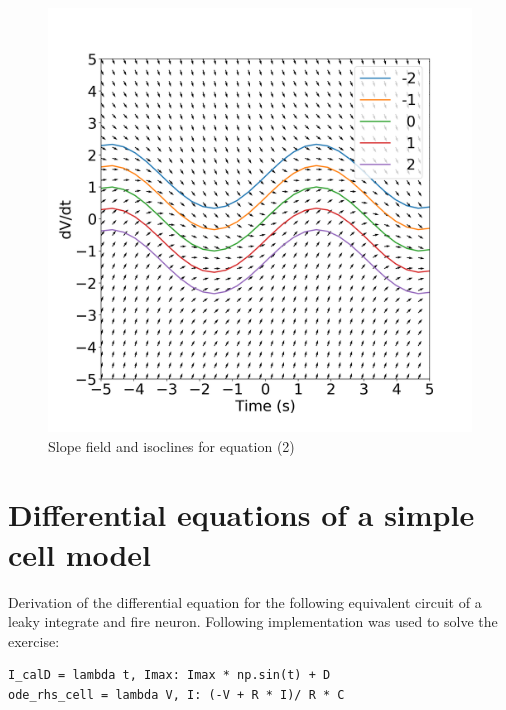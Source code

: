 \documentclass{scrartcl}			%
\begin{document}
\begin{figure}[H]					%
	\centering
	\includegraphics[scale=0.36]{1_1.png}
	\captionsetup{width=\linewidth}  %
	\caption{Slope field and isoclines for equation (2)}
	\label{subsec_fig1_1} %
\end{figure}

\section{Differential equations of a simple cell model}

Derivation of the differential equation for the following equivalent circuit of a leaky integrate
and fire neuron. Following implementation was used to solve the exercise:
\begin{verbatim}
I_calD = lambda t, Imax: Imax * np.sin(t) + D 
ode_rhs_cell = lambda V, I: (-V + R * I)/ R * C
\end{verbatim}
\end{document}
